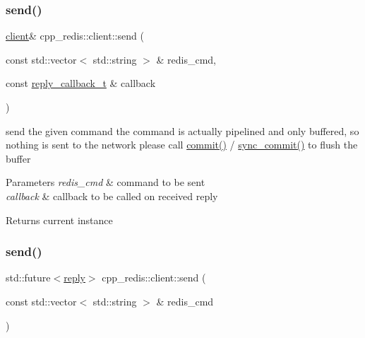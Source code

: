 \subsubsection{\texorpdfstring{send()}{send()}\hspace{0.1cm}{\footnotesize\ttfamily [1/2]}}
{\footnotesize\ttfamily \mbox{\hyperlink{classcpp__redis_1_1client}{client}}\& cpp\+\_\+redis\+::client\+::send (\begin{DoxyParamCaption}\item[{const std\+::vector$<$ std\+::string $>$ \&}]{redis\+\_\+cmd,  }\item[{const \mbox{\hyperlink{classcpp__redis_1_1client_af7a65eb21aa25230bfbb0b0203c4fc04}{reply\+\_\+callback\+\_\+t}} \&}]{callback }\end{DoxyParamCaption})}

send the given command the command is actually pipelined and only buffered, so nothing is sent to the network please call \mbox{\hyperlink{classcpp__redis_1_1client_a18e123faf9400013ad2f1063e5824dc0}{commit()}} / \mbox{\hyperlink{classcpp__redis_1_1client_ad7d61dadf264bcf27092d9f7f3ff1fd7}{sync\+\_\+commit()}} to flush the buffer


\begin{DoxyParams}{Parameters}
{\em redis\+\_\+cmd} & command to be sent \\
\hline
{\em callback} & callback to be called on received reply \\
\hline
\end{DoxyParams}
\begin{DoxyReturn}{Returns}
current instance 
\end{DoxyReturn}
\mbox{\label{classcpp__redis_1_1client_ad6216d6587d50694c16d68e8e182b0be}} 
\subsubsection{\texorpdfstring{send()}{send()}\hspace{0.1cm}{\footnotesize\ttfamily [2/2]}}
{\footnotesize\ttfamily std\+::future$<$\mbox{\hyperlink{classcpp__redis_1_1reply}{reply}}$>$ cpp\+\_\+redis\+::client\+::send (\begin{DoxyParamCaption}\item[{const std\+::vector$<$ std\+::string $>$ \&}]{redis\+\_\+cmd }\end{DoxyParamCaption})}

